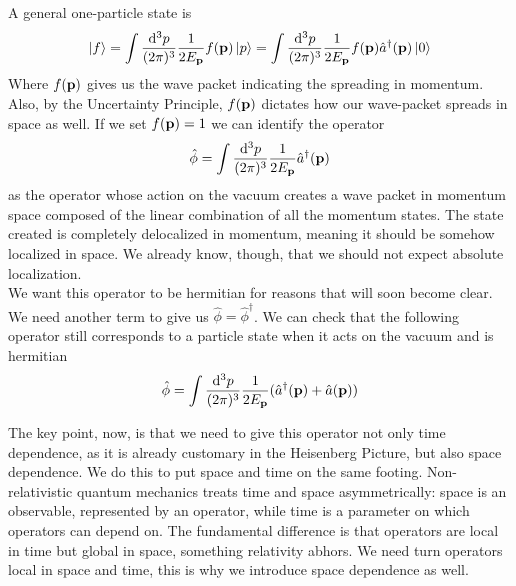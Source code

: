 A general one-particle state is
\begin{equation}
    \ket{f}=\int\frac{\dd^3p}{(2\pi)^3}\frac{1}{2E_{\vb{p}}}f({\vb{p}})\ket{{p}}=\int\frac{\dd^3p}{(2\pi)^3}\frac{1}{2E_{\vb{p}}}f(\vb{p})\hat{a}^\dagger(\vb{p})\ket{0}
\end{equation}
Where $f(\vb{p})$ gives us the wave packet indicating the spreading in momentum. Also, by the Uncertainty Principle, $f(\vb{p})$ dictates how our wave-packet spreads in space as well. If we set $f(\vb{p})=1$ we can identify the operator 
\begin{equation}
    \hat{\phi}=\int\frac{\dd^3p}{(2\pi)^3}\frac{1}{2E_{\vb{p}}}\hat{a}^\dagger(\vb{p})
\end{equation}as the operator whose action on the vacuum creates a wave packet in momentum space composed of the linear combination of all the momentum states. The state created is completely delocalized in momentum, meaning it should be somehow localized in space. We already know, though, that we should not expect absolute localization.\\

We want this operator to be hermitian for reasons that will soon become clear. We need another term to give us $\hat{\phi}=\hat{\phi}^\dagger$. We can check that the following operator still corresponds to a particle state when it acts on the vacuum and is hermitian
\begin{equation}
    \hat{\phi}=\int\frac{\dd^3p}{(2\pi)^3}\frac{1}{2E_{\vb{p}}}(\hat{a}^\dagger(\vb{p})+\hat{a}(\vb{p}))
    \label{creation_localized}
\end{equation}

The key point, now, is that we need to give this operator not only time dependence, as it is already customary in the Heisenberg Picture, but also space dependence. We do this to put space and time on the same footing. Non-relativistic quantum mechanics treats time and space asymmetrically: space is an observable, represented by an operator, while time is a parameter on which operators can depend on. The fundamental difference is that operators are local in time but global in space, something relativity abhors. We need turn operators local in space and time, this is why we introduce space dependence as well.\\

